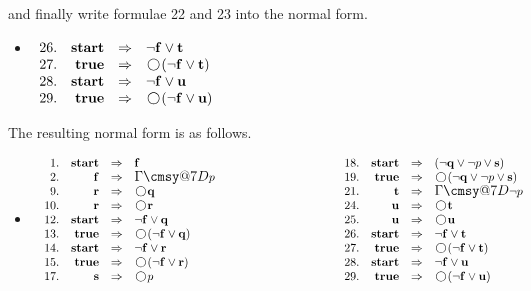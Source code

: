 \documentclass[nohyperref]{acmtrans2f}
\makeatletter
\def\sometime{\mathord{\hbox{\large$\mathchar"0\cmsy@7D$}}}
\newcommand{\next}{\!\raisebox{-.2ex}{ %
                        \mbox{\unitlength=0.9ex
                        \begin{picture}(2,2)
                        \linethickness{0.06ex}
                        \put(1,1){\circle{2}} %
                        \end{picture}}}       %
                        \,}
\let\imp=\Rightarrow
\def\ltrue{\hbox{\rm\bf true}}
\def\lstart{\hbox{\rm\bf start}}
\makeatother
\begin{document}
and finally write formulae 22 and 23 into the normal form.
\begin{itemize}
\item[] $\begin{array}[t]{rrcl}
26. & \lstart & \imp &  \neg {\bf f} \lor {\bf t} \\
27. & \ltrue  & \imp &  \next (\neg {\bf f} \lor {\bf t}) \\
28. &   \lstart & \imp & \neg {\bf f} \lor {\bf u} \\
29. &   \ltrue & \imp & \next(\neg {\bf f} \lor {\bf u}) \\
\end{array}$
\end{itemize}
The resulting normal form is as follows.
\begin{itemize}
\item[] 
$\begin{array}{ll}
\begin{array}[t]{rrcl}
1. & \lstart & \imp & {\bf f} \\
2. & {\bf f} &  \imp & \sometime p \\
9. & {\bf r} & \imp & \next {\bf q} \\
10. & {\bf r} & \imp & \next {\bf r} \\
12. & \lstart & \imp & \neg {\bf f} \lor {\bf q} \\
13. & \ltrue & \imp & \next(\neg {\bf f} \lor {\bf q}) \\
14. & \lstart & \imp & \neg {\bf f} \lor {\bf r} \\
15. & \ltrue & \imp & \next(\neg {\bf f} \lor {\bf r}) \\
17. & {\bf s} & \imp & \next p \\
\end{array} 
\qquad \qquad \qquad \qquad \qquad
\begin{array}[t]{rrcl}
18. & \lstart & \imp & (\neg {\bf q} \lor \neg p \lor {\bf s}) \\
19. & \ltrue & \imp & \next (\neg {\bf q} \lor \neg p \lor {\bf s}) \\
21. & {\bf t} & \imp & \sometime \neg p \\
24. &    {\bf u} & \imp & \next {\bf t} \\
25. &    {\bf u} & \imp & \next {\bf u} \\
26. & \lstart & \imp &  \neg {\bf f} \lor {\bf t} \\
27. & \ltrue  & \imp &  \next (\neg {\bf f} \lor {\bf t}) \\
28. &   \lstart & \imp & \neg {\bf f} \lor {\bf u} \\
29. &   \ltrue & \imp & \next(\neg {\bf f} \lor {\bf u}) \\
\end{array}
\end{array}$
\end{itemize}
\end{document}
